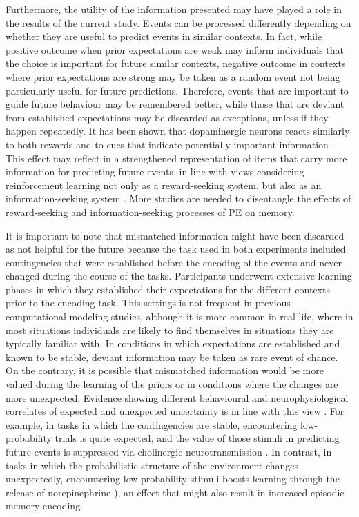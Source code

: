 \documentclass[a4paper,12pt]{article}
\begin{document}
Furthermore, the utility of the information presented may have played a role in the results of the current study. Events can be processed differently depending on whether they are useful to predict events in similar contexts. In fact, while positive outcome when prior expectations are weak may inform individuals that the choice is important for future similar contexts, negative outcome in contexts where prior expectations are strong may be taken as a random event not being particularly useful for future predictions. Therefore, events that are important to guide future behaviour may be remembered better, while those that are deviant from established expectations may be discarded as exceptions, unless if they happen repeatedly. It has been shown that dopaminergic neurons reacts similarly to both rewards and to cues that indicate potentially important information \citep{bromberg2011lateral}. This effect may reflect in a strengthened representation of items that carry more information for predicting future events, in line with views considering reinforcement learning not only as a reward-seeking system, but also as an information-seeking system \citep{bromberg2011lateral, Niv2011}. More studies are needed to disentangle the effects of reward-seeking and information-seeking processes of PE on memory. \par
It is important to note that mismatched information might have been discarded as not helpful for the future because the task used in both experiments included contingencies that were established before the encoding of the events and never changed during the course of the tasks. Participants underwent extensive learning phases in which they established their expectations for the different contexts prior to the encoding task. This settings is not frequent in previous computational modeling studies, although it is more common in real life, where in most situations individuals are likely to find themselves in situations they are typically familiar with. In conditions in which expectations are established and known to be stable, deviant information may be taken as rare event of chance. On the contrary, it is possible that mismatched information would be more valued during the learning of the priors or in conditions where the changes are more unexpected. Evidence showing different behavioural and neurophysiological correlates of expected and unexpected uncertainty is in line with this view \citep{Yu2005}. For example, in tasks in which the contingencies are stable, encountering low-probability trials is quite expected, and the value of those stimuli in predicting future events is suppressed via cholinergic neurotransmission \citep{witte1997effects}. In contrast, in tasks in which the probabilistic structure of the environment changes unexpectedly, encountering low-probability stimuli boosts learning through the release of norepinephrine \cite{Yu2005}), an effect that might also result in increased episodic memory encoding. 
\end{document}
